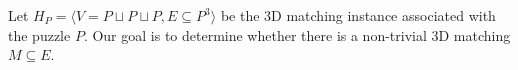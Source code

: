 \documentclass[11pt]{article}
\begin{document}
Let $H_P = \langle V = P \sqcup P \sqcup P, E \subseteq P^3 \rangle$ be the 3D matching instance
associated with the puzzle $P$.  Our goal is to determine whether there is a
non-trivial 3D matching $M \subseteq E$.
\end{document}
